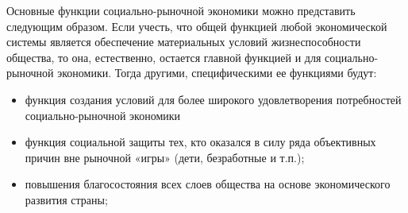 \documentclass[14pt,a4paper]{article}
\begin{document}
    \par
    Основные функции социально-рыночной экономики можно представить следующим образом. Если учесть, что общей функцией любой экономической системы является обеспечение материальных условий жизнеспособности общества, то она, естественно, остается главной функцией и для социально-рыночной экономики. Тогда другими, специфическими ее функциями будут:
    \begin{itemize}
        \item функция создания условий для более широкого удовлетворения потребностей социально-рыночной экономики
        \item функция социальной защиты тех, кто оказался в силу ряда объективных причин вне рыночной «игры» (дети, безработные и т.п.);
        \item повышения благосостояния всех слоев общества на основе экономического развития страны;
    \end{itemize}
\end{document}
